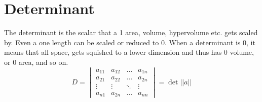 \section{Determinant}
The determinant is the scalar that a 1 area, volume, hypervolume etc. gets scaled by. Even a one length can be scaled or reduced to 0. When a determinant is 0, it means that all space, gets squished to a lower dimension and thus has 0 volume, or 0 area, and so on.
\[D = 
\begin{vmatrix}
a_{11} & a_{12} & \dots & a_{1n}\\
a_{21} & a_{22} & \dots & a_{2n}\\
\vdots & \vdots & \ddots & \vdots \\
a_{n1} & a_{2n} & \dots & a_{nn}
\end{vmatrix} = \det||a||
\]

